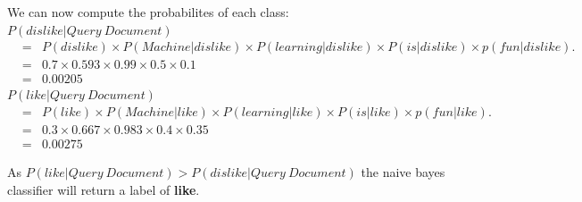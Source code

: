 \documentclass[solution]{ditpaper}
\begin{document}
\begin{answer}
We can now compute the probabilites of each class:\\

$P(dislike|Query~Document)$
			\begin{eqnarray*}
&=& P(dislike) \times P(Machine|dislike) \times P(learning|dislike) \times P(is|dislike) \times p(fun|dislike).\\
&=& 0.7 \times 0.593 \times 0.99 \times 0.5 \times 0.1\\
&=& 0.00205
			\end{eqnarray*}
$P(like|Query~Document)$
			\begin{eqnarray*}
&=& P(like) \times P(Machine|like) \times P(learning|like) \times P(is|like) \times p(fun|like).\\
&=& 0.3 \times 0.667 \times 0.983 \times 0.4 \times 0.35\\
&=& 0.00275
			\end{eqnarray*}
			
As $P(like|Query~Document) > P(dislike|Query~Document)$ the naive bayes classifier will return a label of \textbf{like}.
		\end{answer}
%
\newpage

\end{document}
